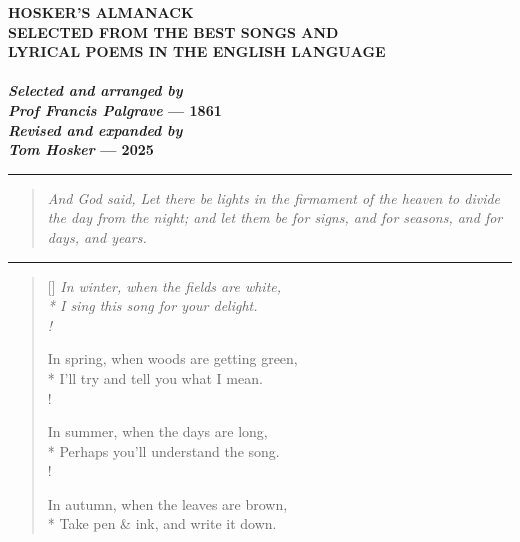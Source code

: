 \thispagestyle{empty}

\vspace*{\fill}

\begin{center}
    {\Huge \textbf{HOSKER'S ALMANACK}}\\
    {\large \textbf{SELECTED FROM THE BEST SONGS AND}}\\
    {\large \textbf{LYRICAL POEMS IN THE ENGLISH LANGUAGE}}\\
    \bigskip
    \bigskip
    \bigskip
    {\large {}}\\
    \bigskip
    \bigskip
    \bigskip
    {\large \textbf{\textit{Selected and arranged by}}}\\
    {\large \textbf{\textit{Prof Francis Palgrave} --- 1861}}\\
    \bigskip
    {\large \textbf{\textit{Revised and expanded by}}}\\
    {\large \textbf{\textit{Tom Hosker} --- 2025}}
\end{center}

\bigskip
\bigskip
\begin{center}
    \rule{0.5\textwidth}{0.5pt}
\end{center}
\bigskip
\bigskip

\begin{quote}
    \textit{And God said, Let there be lights in the firmament of the heaven to divide the day from the night; and let them be for signs, and for seasons, and for days, and years.}
\end{quote}

\bigskip
\bigskip
\begin{center}
    \rule{0.5\textwidth}{0.5pt}
\end{center}
\bigskip
\bigskip

\settowidth{\versewidth}{In winter, when the fields are white,}
\begin{verse}[\versewidth]
    \it
    In winter, when the fields are white,\\*
    I sing this song for your delight.\\!

    In spring, when woods are getting green,\\*
    I'll try and tell you what I mean.\\!

    In summer, when the days are long,\\*
    Perhaps you'll understand the song.\\!

    In autumn, when the leaves are brown,\\*
    Take pen \& ink, and write it down.
\end{verse}

